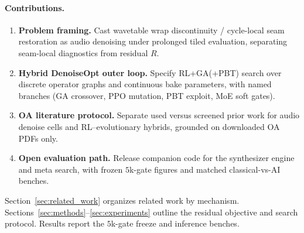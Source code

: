 \paragraph{Contributions.}
\begin{enumerate}
  \item \textbf{Problem framing.} Cast wavetable wrap discontinuity / cycle-local seam restoration as audio denoising under prolonged tiled evaluation, separating seam-local diagnostics from residual $R$.
  \item \textbf{Hybrid DenoiseOpt outer loop.} Specify RL+GA(+PBT) search over discrete operator graphs and continuous bake parameters, with named branches (GA crossover, PPO mutation, PBT exploit, MoE soft gates).
  \item \textbf{OA literature protocol.} Separate used versus screened prior work for audio denoise cells and RL--evolutionary hybrids, grounded on downloaded OA PDFs only.
  \item \textbf{Open evaluation path.} Release companion code for the synthesizer engine and meta search, with frozen $5$k-gate figures and matched classical-vs-AI benches.
\end{enumerate}

Section~\ref{sec:related_work} organizes related work by mechanism.
Sections~\ref{sec:methods}--\ref{sec:experiments} outline the residual objective and search protocol.
Results report the $5$k-gate freeze and inference benches.
